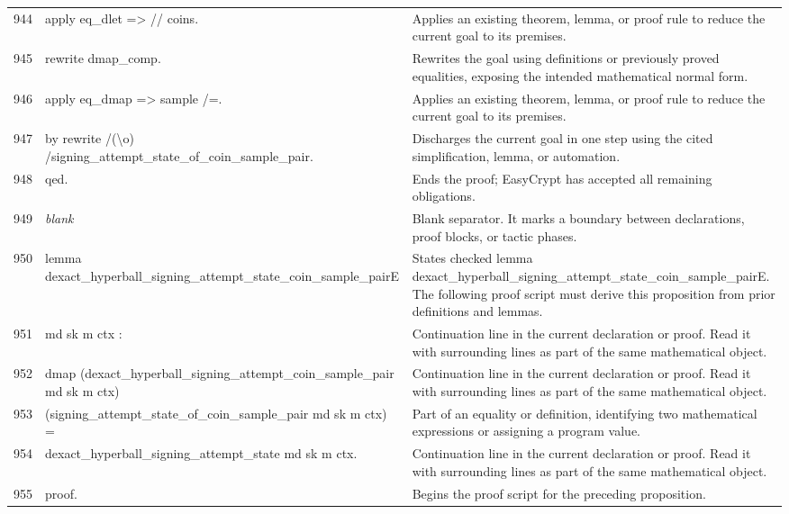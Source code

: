 \documentclass[10pt]{article}
\begin{document}
\begin{longtable}{r L{0.53\textwidth} L{0.37\textwidth}}
944 & {\ttfamily\scriptsize apply eq\_dlet => // coins.} & Applies an existing theorem, lemma, or proof rule to reduce the current goal to its premises. \\
945 & {\ttfamily\scriptsize rewrite dmap\_comp.} & Rewrites the goal using definitions or previously proved equalities, exposing the intended mathematical normal form. \\
946 & {\ttfamily\scriptsize apply eq\_dmap => sample /=.} & Applies an existing theorem, lemma, or proof rule to reduce the current goal to its premises. \\
947 & {\ttfamily\scriptsize by rewrite /(\textbackslash{}o) /signing\_attempt\_state\_of\_coin\_sample\_pair.} & Discharges the current goal in one step using the cited simplification, lemma, or automation. \\
948 & {\ttfamily\scriptsize qed.} & Ends the proof; EasyCrypt has accepted all remaining obligations. \\
949 & {\ttfamily\scriptsize \emph{blank}} & Blank separator.  It marks a boundary between declarations, proof blocks, or tactic phases. \\
950 & {\ttfamily\scriptsize lemma dexact\_hyperball\_signing\_attempt\_state\_coin\_sample\_pairE} & States checked lemma dexact\_hyperball\_signing\_attempt\_state\_coin\_sample\_pairE.  The following proof script must derive this proposition from prior definitions and lemmas. \\
951 & {\ttfamily\scriptsize    md sk m ctx :} & Continuation line in the current declaration or proof.  Read it with surrounding lines as part of the same mathematical object. \\
952 & {\ttfamily\scriptsize   dmap (dexact\_hyperball\_signing\_attempt\_coin\_sample\_pair md sk m ctx)} & Continuation line in the current declaration or proof.  Read it with surrounding lines as part of the same mathematical object. \\
953 & {\ttfamily\scriptsize     (signing\_attempt\_state\_of\_coin\_sample\_pair md sk m ctx) =} & Part of an equality or definition, identifying two mathematical expressions or assigning a program value. \\
954 & {\ttfamily\scriptsize   dexact\_hyperball\_signing\_attempt\_state md sk m ctx.} & Continuation line in the current declaration or proof.  Read it with surrounding lines as part of the same mathematical object. \\
955 & {\ttfamily\scriptsize proof.} & Begins the proof script for the preceding proposition. \\

\end{longtable}
\end{document}
